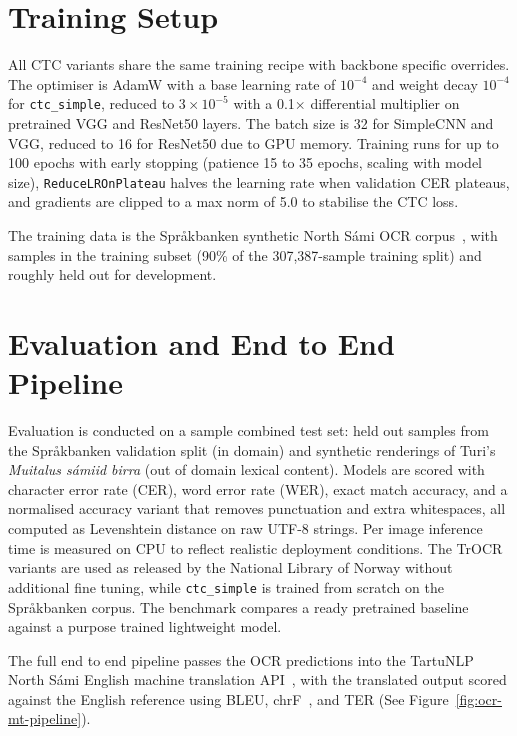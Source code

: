 \section{Training Setup}
\label{sec:training-setup}

All CTC variants share the same training recipe with backbone specific overrides. The optimiser is AdamW with a base learning rate of $10^{-4}$ and weight decay $10^{-4}$ for \texttt{ctc\_simple}, reduced to $3\times 10^{-5}$ with a 0.1$\times$ differential multiplier on pretrained VGG and ResNet50 layers. The batch size is 32 for SimpleCNN and VGG, reduced to 16 for ResNet50 due to GPU memory. Training runs for up to 100 epochs with early stopping (patience 15 to 35 epochs, scaling with model size), \texttt{ReduceLROnPlateau} halves the learning rate when validation CER plateaus, and gradients are clipped to a max norm of 5.0 to stabilise the CTC loss.

The training data is the Spr\r{a}kbanken synthetic North S\'{a}mi OCR corpus~\cite{sprakbanken_dataset,enstad2025}, with \trainSamples{} samples in the training subset (90\% of the 307{,}387-sample training split) and roughly \hfValidationSamples{} held out for development. 


\section{Evaluation and End to End Pipeline}
\label{sec:evaluation-pipeline}

Evaluation is conducted on a \testSamples{} sample combined test set: \hfTestSamples{} held out samples from the Spr\r{a}kbanken validation split (in domain) and \bookTestSamples{} synthetic renderings of Turi's \turiYear{} \textit{Muitalus s\'{a}miid birra} (out of domain lexical content). Models are scored with character error rate (CER), word error rate (WER), exact match accuracy, and a normalised accuracy variant that removes punctuation and extra whitespaces, all computed as Levenshtein distance on raw UTF-8 strings. Per image inference time is measured on CPU to reflect realistic deployment conditions. The TrOCR variants are used as released by the National Library of Norway without additional fine tuning, while \texttt{ctc\_simple} is trained from scratch on the Spr\r{a}kbanken corpus. The benchmark compares a ready pretrained baseline against a purpose trained lightweight model.

The full end to end pipeline passes the OCR predictions into the TartuNLP North S\'{a}mi English machine translation API~\cite{tartunlp}, with the translated output scored against the English reference using BLEU, chrF~\cite{popovic2015chrf}, and TER (See Figure~\ref{fig:ocr-mt-pipeline}).

